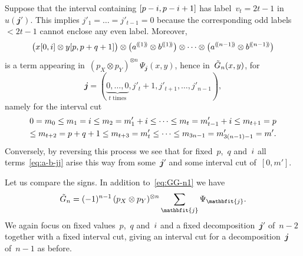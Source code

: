 \documentclass[letterpaper]{amsart}
\numberwithin{equation}{section}
\theoremstyle{plain}
\theoremstyle{definition}
\theoremstyle{remark}
\def\jj{\mathbfit{j}}
\def\sweehgc#1#2{#1^{(\!(#2)\!)}}
\def\restr#1#2#3{#1[#2,#3]}
\begin{document}
Suppose that the interval containing $[p-i,p-i+1]$ has label~$v_{t}=2t-1$ in~$u(\jj')$.
This implies $j'_{1}=\dots=j'_{t-1}=0$ because the corresponding odd labels~$<2t-1$ cannot enclose any even label. Moreover,
\begin{equation}
  \label{eq:a-b-jj}
  \bigl(\restr{x}{0}{\si} \otimes \restr{y}{p}{p+q+1}\bigr) \otimes
  \bigl(\sweehgc{a}{1} \otimes \sweehgc{b}{1}\bigr) \otimes \dots \otimes \bigl(\sweehgc{a}{n-1} \otimes \sweehgc{b}{n-1}\bigr)
\end{equation}
is a term appearing in~$(p_{X}\otimes p_{Y})^{\otimes n}\,\Psi_{\jj}(x,y)$, hence in~$\tilde G_{n}(x,y)$, for
\begin{equation}
  \jj = (\underbrace{0,\dots,0}_{\text{$t$~times}},j'_{t}+1,j'_{t+1},\dots,j'_{n-1}),
\end{equation}
namely for the interval cut
\begin{multline}
  0=m_{0}\le m_{1}=i\le m_{2} = m'_{1}+i \le \dots \le m_{t} = m'_{t-1}+i \le m_{t+1} = p \\
  \le m_{t+2} = p+q+1 \le m_{t+3} = m'_{t} \le \dots \le m_{3n-1} = m'_{3(n-1)-1} = m'.
\end{multline}
Conversely, by reversing this process we see that for fixed~$p$,~$q$ and~$i$ all terms~\eqref{eq:a-b-jj} arise this way
from some~$\jj'$ and some interval cut of~$[0,m']$.

Let us compare the signs. In addition to~\eqref{eq:GG-n1} we have
\begin{equation}
  \label{eq:comp-Psi}
  \GG_{n} = (-1)^{n-1}\,(p_{X}\otimes p_{Y})^{\otimes n}\sum_{\jj} \Psi_{\jj}.
\end{equation}
We again focus on fixed values~$p$,~$q$ and~$i$ and a fixed decomposition~$\jj'$ of~$n-2$ together with a fixed interval cut,
giving an interval cut for a decomposition~$\jj$ of~$n-1$ as before.
\end{document}
